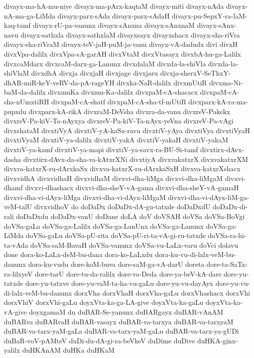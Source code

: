 {divayx-ma-hA-mu-niye
divayx-ma-pArx-kaqtaM
divayx-miti
divayx-nAda
divayx-nA-ma-ga-LiMda
divayx-parx-sAda
divayx-parx-sAdaH
divayx-pu-SepxY-ra-laM-kaq-tamf
divayx-rU-pa-vanunx
divayx-sAnxna
divayx-sAnxnaM
divayx-sAnx-navu
divayx-sathxla
divayx-sathxlaM
divayxsayx
divayxshacx
divayx-sha-riVra
divayx-sha-riVraM
divayx-teV-jaH-puM-ja-vanu
divayx-vA-dadudx
divi
divxH
divxVpa-dalilx
divxVpa-sA-garAH
divxVtaM
divxVtasayx
divxbA-hu-ga-Lalilx
divxcaMdarx
divxcaM-darx-ga-Lanunx
divxdalaM
divxda-la-shiVla
divxda-la-shiVlaM
divxdhA
divxja
divxjaH
divxjage
divxjaru
divxja-sherxV-SeThxY-dhAR-miR-keY-veRV-da-pA-rageYH
divxka-NaR-dalilx
divxmUtiR
divxma-Ni-baM-da-dalilx
divxmuKa
divxmu-Ka-dalilx
divxpaM-cA-shacacx
divxpaM-cA-sha-nUmxtiRH
divxpaM-cA-shatf
divxpaM-cA-sha-tf-mUtiR
divxparx-kA-ra-ma-pupxdu
divxparx-kA-rikA
divxraM-DeVsha
divxra-da-vanu
divxreV-Pakekx
divxreV-Pa-kiV-Ta-nAyxya
divxreV-Pa-kiV-Ta-nAyx-yeVna
divxreV-Pa-vAgi
divxshataM
divxtiVyA
divxtiV-yA-kaSx-ravu
divxtiV-yAya
divxtiVya
divxtiVyaH
divxtiVyaM
divxtiV-ya-dalilx
divxtiV-yakA
divxtiV-yakaH
divxtiV-yakaM
divxtiV-ya-kamf
divxtiV-ya-mapi
divxtiV-ya-savx-ra-BU-Si-tamf
divxtirx-dAvx-dasha
divxtirx-dAvx-da-sha-va-kAtxrXNi
divxtiyA
divxvakatxrX
divxvakatxrXM
divxva-katxrX-ru-dArxkaSx
divxva-katxrX-ru-dArxkaSxH
divxva-katxrXshacx
divxvidhA
divxvidhaH
divxvidhaM
divxvi-dha-liMga
divxvi-dha-liMgaM
divxvi-dhamf
divxvi-dhashacx
divxvi-dha-sheY-vA-gama
divxvi-dha-sheY-vA-gamaH
divxvi-dha-vi-dAyx-liMga
divxvi-dha-vi-dAyx-liMgaM
divxvi-dha-vi-dAyx-liM-ga-veM-talU
divxvidhoV
do
doDaDx
doDaDx-dA-gu-tatxde
doDaDxdU
doDaDx-di-rali
doDaDxdu
doDaDx-vanU
doDane
doLA
doV
doVSAH
doVSa
doVSa-BoVgi
doVSa-gaLa
doVSa-ga-Lalilx
doVSa-ga-LanUnx
doVSa-ga-Lanunx
doVSa-ga-LiMda
doVSa-gaLu
doVSa-pU-rita
doVSa-pU-ri-ta-vA-gi-ru-tatxde
doVSa-ra-hi-ta-vAda
doVSa-saM-BavaH
doVSa-vanunx
doVSa-vu-LaLx-varu
doVci
dolavu
done
dora-ko-LaLx-deM-bu-dana
dora-ko-LaLxdu
dora-ku-vu-di-lalx-veM-bu-danunx
dora-ku-vudu
dore-koM-buva
dore-saM-ga-vA-darU
doreta
dore-ta-SaTx-ra-lilxyeV
dore-tarU
dore-tu-da-ralilx
dore-va-Deda
dore-ya-beV-kA-dare
dore-yu-tatxde
dore-yu-tatxve
dore-yu-vaM-ta-ha-vu-gaLu
dore-yu-vu-dayAyx
dore-yu-vu-di-lalx-veM-bu-danunx
dorxVha
dorxVhaH
dorxVha-gaLu
dorxVhashacx
dorxVhi
dorxVhiV
dorxVhi-gaLu
doyxVta-ka-ga-LA-give
doyxVta-ka-gaLu
doyxVta-ka-vA-give
doyxgamaM
du
duBAR-Se-yanunx
duBARgayx
duBAR-vAnAM
duBARva
duBARvaH
duBAR-vasayx
duBAR-va-tarxya
duBAR-va-tarxyaM
duBAR-va-tarx-yaM-gaLa
duBAR-va-tarx-yaM-gaLu
duBAR-va-tarx-ya-gUDi
duBaR-voV-pAMteV
duDi-du-dA-gi-ra-beVkeV
duDime
duDive
duHKA-ginx-yalilx
duHKAnAM
duHKa
duHKaM
}
